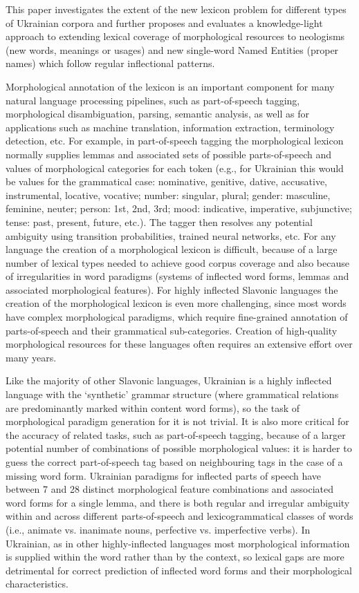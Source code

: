 \documentclass[11pt,a4paper]{article}
\begin{document}
This paper investigates the extent of the new lexicon problem for different types of Ukrainian corpora and further proposes and evaluates a knowledge-light approach to extending lexical coverage of morphological resources to neologisms (new words, meanings or usages) and new single-word Named Entities (proper names) which follow regular inflectional patterns.

Morphological annotation of the lexicon is an important component for many natural language processing pipelines, such as part-of-speech tagging, morphological disambiguation, parsing, semantic analysis, as well as for applications such as machine translation, information extraction, terminology detection, etc. For example, in part-of-speech tagging the morphological lexicon normally supplies lemmas and associated sets of possible parts-of-speech and values of morphological categories for each token (e.g., for Ukrainian this would be values for the grammatical case: nominative, genitive, dative, accusative, instrumental, locative, vocative; number: singular, plural; gender: masculine, feminine, neuter; person: 1st, 2nd, 3rd; mood: indicative, imperative, subjunctive; tense: past, present, future, etc.). The tagger then resolves any potential ambiguity using transition probabilities, trained neural networks, etc. For any language the creation of a morphological lexicon is difficult, because of a large number of lexical types needed to achieve good corpus coverage and also because of irregularities in word paradigms (systems of inflected word forms, lemmas and associated morphological features). For highly inflected Slavonic languages the creation of the morphological lexicon is even more challenging, since most words have complex morphological paradigms, which require fine-grained annotation of parts-of-speech and their grammatical sub-categories. Creation of high-quality morphological resources for these languages often requires an extensive effort over many years.

Like the majority of other Slavonic languages, Ukrainian is a highly inflected language with the `synthetic' grammar structure (where grammatical relations are predominantly marked within content word forms), so the task of morphological paradigm generation for it is not trivial. It is also more critical for the accuracy of related tasks, such as part-of-speech tagging, because of a larger potential number of combinations of possible morphological values: it is harder to guess the correct part-of-speech tag based on neighbouring tags in the case of a missing word form. Ukrainian paradigms for inflected parts of speech have between 7 and 28 distinct morphological feature combinations and associated word forms for a single lemma, and there is both regular and irregular ambiguity within and across different parts-of-speech and lexicogrammatical classes of words (i.e., animate vs. inanimate nouns, perfective vs. imperfective verbs). In Ukrainian, as in other highly-inflected languages most morphological information is supplied within the word rather than by the context, so lexical gaps are more detrimental for correct prediction of inflected word forms and their morphological characteristics.
\end{document}
